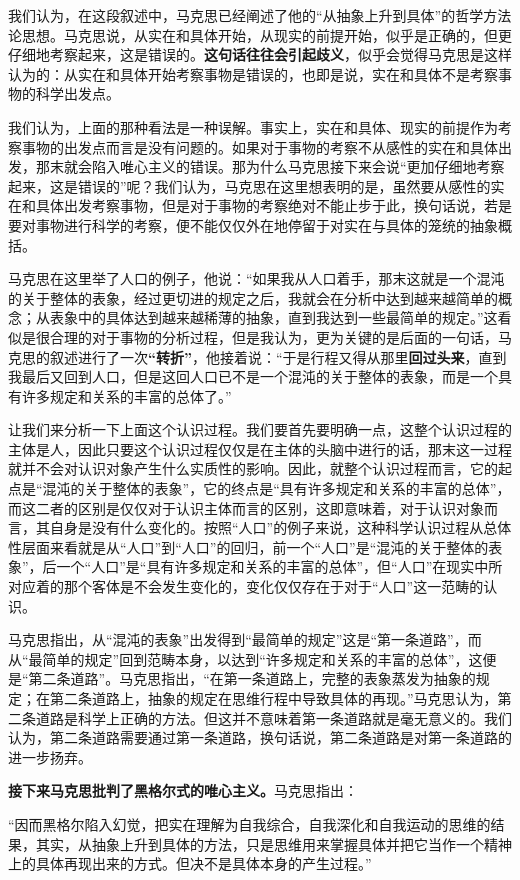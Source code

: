 \documentclass[a4paper,twoside,12pt,AutoFakeBold]{ctexart}
\begin{document}
我们认为，在这段叙述中，马克思已经阐述了他的“从抽象上升到具体”的哲学方法论思想。马克思说，从实在和具体开始，从现实的前提开始，似乎是正确的，但更仔细地考察起来，这是错误的。\textbf{这句话往往会引起歧义}，似乎会觉得马克思是这样认为的：从实在和具体开始考察事物是错误的，也即是说，实在和具体不是考察事物的科学出发点。

我们认为，上面的那种看法是一种误解。事实上，实在和具体、现实的前提作为考察事物的出发点而言是没有问题的。如果对于事物的考察不从感性的实在和具体出发，那末就会陷入唯心主义的错误。那为什么马克思接下来会说“更加仔细地考察起来，这是错误的”呢？我们认为，马克思在这里想表明的是，虽然要从感性的实在和具体出发考察事物，但是对于事物的考察绝对不能止步于此，换句话说，若是要对事物进行科学的考察，便不能仅仅外在地停留于对实在与具体的笼统的抽象概括。

马克思在这里举了人口的例子，他说：“如果我从人口着手，那末这就是一个混沌的关于整体的表象，经过更切进的规定之后，我就会在分析中达到越来越简单的概念；从表象中的具体达到越来越稀薄的抽象，直到我达到一些最简单的规定。”这看似是很合理的对于事物的分析过程，但是我认为，更为关键的是后面的一句话，马克思的叙述进行了一次\textbf{“转折”}，他接着说：“于是行程又得从那里\textbf{回过头来}，直到我最后又回到人口，但是这回人口已不是一个混沌的关于整体的表象，而是一个具有许多规定和关系的丰富的总体了。”

让我们来分析一下上面这个认识过程。我们要首先要明确一点，这整个认识过程的主体是人，因此只要这个认识过程仅仅是在主体的头脑中进行的话，那末这一过程就并不会对认识对象产生什么实质性的影响。因此，就整个认识过程而言，它的起点是“混沌的关于整体的表象”，它的终点是“具有许多规定和关系的丰富的总体”，而这二者的区别是仅仅对于认识主体而言的区别，这即意味着，对于认识对象而言，其自身是没有什么变化的。按照“人口”的例子来说，这种科学认识过程从总体性层面来看就是从“人口”到“人口”的回归，前一个“人口”是“混沌的关于整体的表象”，后一个“人口”是“具有许多规定和关系的丰富的总体”，但“人口”在现实中所对应着的那个客体是不会发生变化的，变化仅仅存在于对于“人口”这一范畴的认识。

马克思指出，从“混沌的表象”出发得到“最简单的规定”这是“第一条道路”，而从“最简单的规定”回到范畴本身，以达到“许多规定和关系的丰富的总体”，这便是“第二条道路”。马克思指出，“在第一条道路上，完整的表象蒸发为抽象的规定；在第二条道路上，抽象的规定在思维行程中导致具体的再现。”马克思认为，第二条道路是科学上正确的方法。但这并不意味着第一条道路就是毫无意义的。我们认为，第二条道路需要通过第一条道路，换句话说，第二条道路是对第一条道路的进一步扬弃。

\textbf{接下来马克思批判了黑格尔式的唯心主义。}马克思指出：
\begin{adjustwidth}{2em}{2em}
    \qquad\fangsong
    “因而黑格尔陷入幻觉，把实在理解为自我综合，自我深化和自我运动的思维的结果，其实，从抽象上升到具体的方法，只是思维用来掌握具体并把它当作一个精神上的具体再现出来的方式。但决不是具体本身的产生过程。”
\end{adjustwidth}
\end{document}
